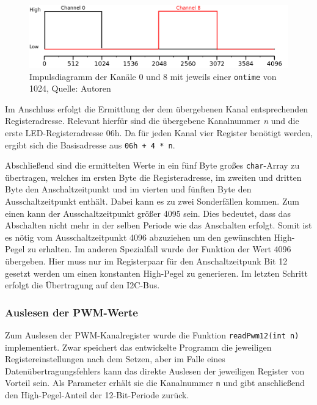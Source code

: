 \documentclass[a4paper,12pt]{scrartcl}
\begin{document}
\begin{figure}[H]
\begin{center}
\includegraphics[width=0.9\hsize]{./schematics/pwmDiagram2.png}
\end{center}
\caption{\label{fig:pwmExample2}Impulsdiagramm der Kanäle 0 und 8 mit jeweils einer \texttt{ontime} von 1024, Quelle: Autoren}
\end{figure}

Im Anschluss erfolgt die Ermittlung der dem übergebenen Kanal entsprechenden Registeradresse. Relevant hierfür sind die übergebene Kanalnummer \textit{n} und die erste LED-Registeradresse 06h. Da für jeden Kanal vier Register benötigt werden, ergibt sich die Basisadresse aus \texttt{06h + 4 * n}.

Abschließend sind die ermittelten Werte in ein fünf Byte großes \texttt{char}-Array zu übertragen, welches im ersten Byte die Registeradresse, im zweiten und dritten Byte den Anschaltzeitpunkt und im vierten und fünften Byte den Ausschaltzeitpunkt enthält. Dabei kann es zu zwei Sonderfällen kommen. Zum einen kann der Ausschaltzeitpunkt größer 4095 sein. Dies bedeutet, dass das Abschalten nicht mehr in der selben Periode wie das Anschalten erfolgt. Somit ist es nötig vom Ausschaltzeitpunkt 4096 abzuziehen um den gewünschten High-Pegel zu erhalten. Im anderen Spezialfall wurde der Funktion der Wert 4096 übergeben. Hier muss nur im Registerpaar für den Anschaltzeitpunk Bit 12 gesetzt werden um einen konstanten High-Pegel zu generieren. Im letzten Schritt erfolgt die Übertragung auf den I2C-Bus.


\subsubsection{Auslesen der PWM-Werte}
Zum Auslesen der PWM-Kanalregister wurde die Funktion \texttt{readPwm12(int n)} implementiert. Zwar speichert das entwickelte Programm die jeweiligen Registereinstellungen nach dem Setzen, aber im Falle eines Datenübertragungsfehlers kann das direkte Auslesen der jeweiligen Register von Vorteil sein. Als Parameter erhält sie die Kanalnummer \texttt{n} und gibt anschließend den High-Pegel-Anteil der 12-Bit-Periode zurück.
\end{document}
